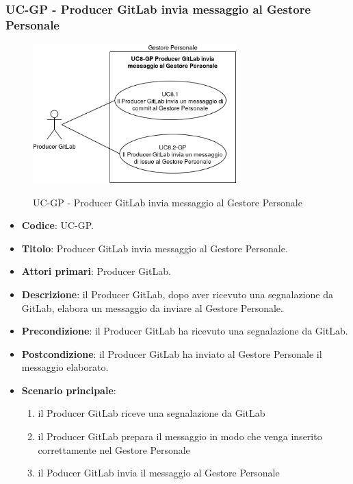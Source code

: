 \subsubsection{UC\theuccount-GP - Producer GitLab invia messaggio al Gestore Personale}
	\begin{figure}[H]
		\centering
		\includegraphics[width=0.7\textwidth]{img/casi_d'uso/UC8.png}\\
		\caption{UC\theuccount-GP - Producer GitLab invia messaggio al Gestore Personale}
	\end{figure}
	\begin{itemize}
		\item \textbf{Codice}: UC\theuccount-GP.
		\item \textbf{Titolo}: Producer GitLab invia messaggio al Gestore Personale.
		\item \textbf{Attori primari}: Producer GitLab.
		\item \textbf{Descrizione}: il Producer GitLab, dopo aver ricevuto una segnalazione da GitLab, elabora un messaggio da inviare al Gestore Personale.
		\item \textbf{Precondizione}: il Producer GitLab ha ricevuto una segnalazione da GitLab.
		\item \textbf{Postcondizione}: il Producer GitLab ha inviato al Gestore Personale il messaggio elaborato.
		\item \textbf{Scenario principale}: 
		\begin{enumerate}
			\item il Producer GitLab riceve una segnalazione da GitLab
			\item il Producer GitLab prepara il messaggio in modo che venga inserito correttamente nel Gestore Personale
			\item il Poducer GitLab invia il messaggio al Gestore Personale
		\end{enumerate}
		
	\end{itemize}
	
